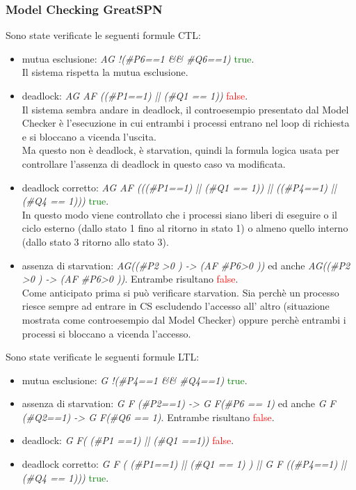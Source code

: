 \documentclass[a4paper]{article}
\begin{document}
\subsubsection{Model Checking GreatSPN}
Sono state verificate le seguenti formule CTL:
\begin{itemize}
	\item mutua esclusione: \textit{AG !(\#P6==1 \&\& \#Q6==1)} \textcolor{green}{true}.\\
		Il sistema rispetta la mutua esclusione.
	\item deadlock: \textit{AG AF ((\#P1==1) || (\#Q1 == 1))} \textcolor{red}{false}.\\
		Il sistema sembra andare in deadlock, il controesempio presentato dal Model Checker è l'esecuzione in cui entrambi i processi entrano nel loop di richiesta e si bloccano a vicenda l'uscita.\\
		Ma questo non è deadlock, è starvation, quindi la formula logica usata per controllare l'assenza di deadlock in questo caso va modificata.
	\item deadlock corretto: \textit{AG AF (((\#P1==1) || (\#Q1 == 1)) || ((\#P4==1) || (\#Q4 == 1)))} \textcolor{green}{true}.\\
		In questo modo viene controllato che i processi siano liberi di eseguire o il ciclo esterno (dallo stato 1 fino al ritorno in stato 1) o almeno quello interno (dallo stato 3 ritorno allo stato 3).
	\item assenza di starvation: \textit{AG((\#P2 >0 ) -> (AF \#P6>0 ))} ed anche \textit{AG((\#P2 >0 ) -> (AF \#P6>0 ))}. Entrambe risultano \textcolor{red}{false}.\\
		Come anticipato prima si può verificare starvation. Sia perchè un processo riesce sempre ad entrare in CS escludendo l'accesso all' altro (situazione mostrata come controesempio dal Model Checker) oppure perchè entrambi i processi si bloccano a vicenda l'accesso.
\end{itemize}
Sono state verificate le seguenti formule LTL:
\begin{itemize}
	\item mutua esclusione: \textit{G !(\#P4==1 \&\& \#Q4==1)} \textcolor{green}{true}.
	\item assenza di starvation: \textit{G F (\#P2==1) -> G F(\#P6 == 1)} ed anche \textit{G F (\#Q2==1) -> G F(\#Q6 == 1)}. Entrambe risultano \textcolor{red}{false}.\\
	\item deadlock: \textit{G F( (\#P1 ==1) ||  (\#Q1 ==1))} \textcolor{red}{false}.
	\item deadlock corretto: \textit{G F ( (\#P1==1) || (\#Q1 == 1) ) || G F ((\#P4==1) || (\#Q4 == 1)))} \textcolor{green}{true}.\\
\end{itemize}
\end{document}
